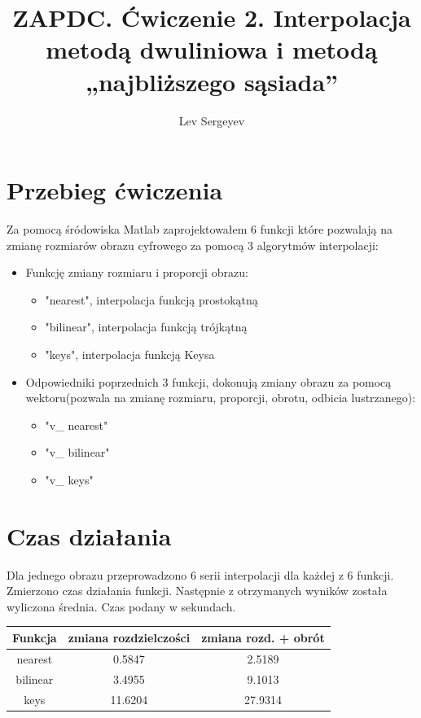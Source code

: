 \documentclass{article}
\author{Lev Sergeyev}
\title{ZAPDC. Ćwiczenie 2. Interpolacja metodą dwuliniowa i metodą „najbliższego sąsiada”}
\date{ }
\begin{document}
\maketitle


\section{Przebieg ćwiczenia}
Za pomocą śródowiska Matlab zaprojektowałem 6 funkcji które pozwalają na zmianę rozmiarów obrazu cyfrowego za pomocą 3 algorytmów interpolacji:
\begin{itemize}
    \item Funkcję zmiany rozmiaru i proporcji obrazu:
	\begin{itemize}
		\item "nearest", interpolacja funkcją prostokątną
		\item "bilinear", interpolacja funkcją trójkątną
		\item "keys", interpolacja funkcją Keysa
	\end{itemize}
    \item Odpowiedniki poprzednich 3 funkcji, dokonują zmiany obrazu za pomocą wektoru(pozwala na zmianę rozmiaru, proporcji, obrotu, odbicia lustrzanego):
	\begin{itemize}
		\item "v\_ nearest"
		\item "v\_ bilinear"
		\item "v\_ keys"
	\end{itemize}
\end{itemize}

\section{Czas działania}
Dla jednego obrazu przeprowadzono 6 serii interpolacji dla każdej z 6 funkcji. Zmierzono czas działania funkcji. Następnie z otrzymanych wyników została wyliczona średnia. Czas podany w sekundach.
\begin{center}
    \begin{tabular}{ | c | c | c |}
    \hline
    Funkcja &  zmiana rozdzielczości & zmiana rozd. + obrót \\ \hline

     nearest  & 0.5847 & 2.5189
    \\ \hline


     bilinear  & 3.4955 & 9.1013
    \\ \hline
    
    
    
     keys & 11.6204 & 27.9314
    \\ \hline

    \end{tabular}
\end{center}
\end{document}
